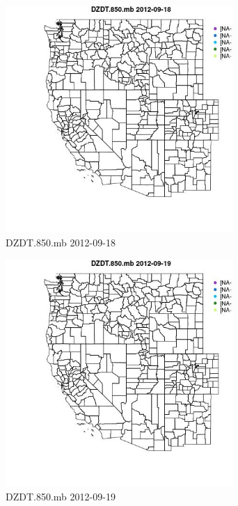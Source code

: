 \begin{figure} 
\centering  
\includegraphics[width=0.77\textwidth]{Code_Outputs/ML_input_report_ML_input_PM25_Step5_part_d_de_duplicated_aves_ML_input_MapObsDZDT850mb2012-09-18.jpg} 
\caption{\label{fig:ML_input_report_ML_input_PM25_Step5_part_d_de_duplicated_aves_ML_inputMapObsDZDT850mb2012-09-18}DZDT.850.mb 2012-09-18} 
\end{figure} 
 

\begin{figure} 
\centering  
\includegraphics[width=0.77\textwidth]{Code_Outputs/ML_input_report_ML_input_PM25_Step5_part_d_de_duplicated_aves_ML_input_MapObsDZDT850mb2012-09-19.jpg} 
\caption{\label{fig:ML_input_report_ML_input_PM25_Step5_part_d_de_duplicated_aves_ML_inputMapObsDZDT850mb2012-09-19}DZDT.850.mb 2012-09-19} 
\end{figure} 
 

